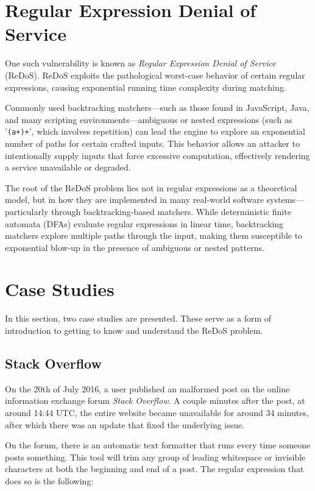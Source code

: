 \section{Regular Expression Denial of Service}
One such vulnerability is known as \emph{Regular Expression Denial of Service} (ReDoS). ReDoS exploits the pathological worst-case behavior of certain regular expressions, causing exponential running time complexity during matching.

Commonly used backtracking matchers---such as those found in JavaScript, Java, and many scripting environments---ambiguous or nested expressions (such as '\texttt{(a+)+}', which involves repetition) can lead the engine to explore an exponential number of paths for certain crafted inputs. This behavior allows an attacker to intentionally supply inputs that force excessive computation, effectively rendering a service unavailable or degraded.

The root of the ReDoS problem lies not in regular expressions as a theoretical model, but in how they are implemented in many real-world software systems—particularly through backtracking-based matchers. While deterministic finite automata (DFAs) evaluate regular expressions in linear time, backtracking matchers explore multiple paths through the input, making them susceptible to exponential blow-up in the presence of ambiguous or nested patterns.

\section{Case Studies}
In this section, two case studies are presented. These serve as a form of introduction to getting to know and understand the ReDoS problem.

\subsection{Stack Overflow}
\label{intro:case_studies:stack_overflow}
On the 20th of July 2016, a user published an malformed post on the online information exchange forum \textit{Stack Overflow}. A couple minutes after the post, at around 14:44 UTC, the entire website became unavailable for around 34 minutes, after which there was an update that fixed the underlying issue.

On the forum, there is an automatic text formatter that runs every time someone posts something. This tool will trim any group of leading whitespace or invisible characters at both the beginning and end of a post. The regular expression that does so is the following:

